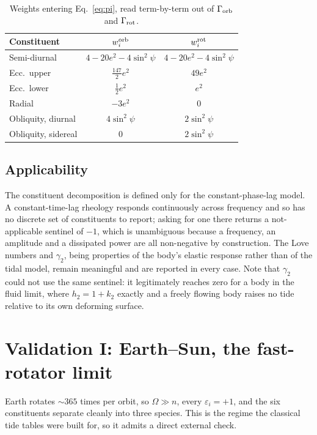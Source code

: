 \documentclass[11pt]{article}
\newcommand{\Om}{\Omega}
\begin{document}
\begin{table}[h]
\centering
\caption{Weights entering Eq.~\eqref{eq:pi}, read term-by-term out of
$\Gamma_{\rm orb}$ and $\Gamma_{\rm rot}$.}
\label{tab:weights}
\begin{tabular}{lcc}
\toprule
Constituent & $w^{\rm orb}_i$ & $w^{\rm rot}_i$ \\
\midrule
Semi-diurnal        & $4 - 20e^2 - 4\sin^2\psi$ & $4 - 20e^2 - 4\sin^2\psi$ \\
Ecc.\ upper         & $\tfrac{147}{2}e^2$       & $49e^2$ \\
Ecc.\ lower         & $\tfrac12 e^2$            & $e^2$ \\
Radial              & $-3e^2$                   & $0$ \\
Obliquity, diurnal  & $4\sin^2\psi$             & $2\sin^2\psi$ \\
Obliquity, sidereal & $0$                       & $2\sin^2\psi$ \\
\bottomrule
\end{tabular}
\end{table}

\subsection{Applicability}

The constituent decomposition is defined only for the constant-phase-lag
model. A constant-time-lag rheology responds continuously across frequency and
so has no discrete set of constituents to report; asking for one there returns
a not-applicable sentinel of $-1$, which is unambiguous because a frequency,
an amplitude and a dissipated power are all non-negative by construction. The
Love numbers and $\gamma_2$, being properties of the body's elastic response
rather than of the tidal model, remain meaningful and are reported in every
case. Note that $\gamma_2$ could not use the same sentinel: it legitimately
reaches zero for a body in the fluid limit, where $h_2 = 1+k_2$ exactly and a
freely flowing body raises no tide relative to its own deforming surface.

\section{Validation I: Earth--Sun, the fast-rotator limit}
\label{sec:earth}

Earth rotates $\sim\!365$ times per orbit, so $\Om \gg n$, every
$\varepsilon_i = +1$, and the six constituents separate cleanly into three
species. This is the regime the classical tide tables were built for, so it
admits a direct external check.
\end{document}
